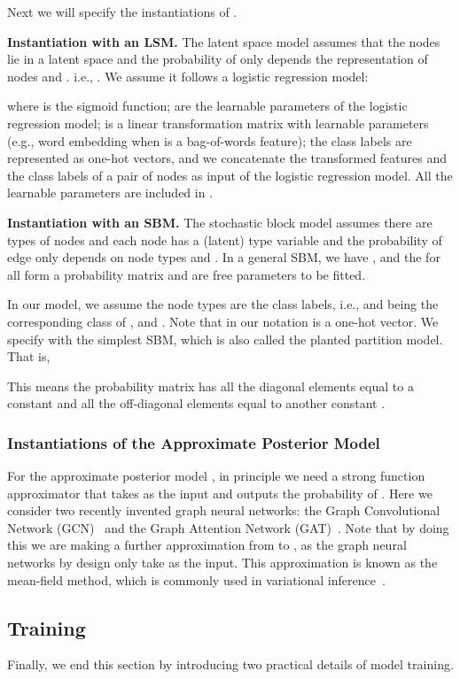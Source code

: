 \documentclass{article}
\newcommand{\vpara}[1]{\vspace{0.05in}\noindent\textbf{#1 }}
\begin{document}
Next we will specify the instantiations of .

\vpara{Instantiation with an LSM.} The latent space model assumes that the nodes lie in a latent space and the probability of  only depends the representation of nodes  and . i.e., . We assume it follows a logistic regression model:

where  is the sigmoid function;  are the learnable parameters of the logistic regression model;  is a linear transformation matrix with learnable parameters (e.g., word embedding when  is a bag-of-words feature); the class labels  are represented as one-hot vectors, and we concatenate the transformed features and the class labels of a pair of nodes as input of the logistic regression model. All the learnable parameters are included in .

\vpara{Instantiation with an SBM.} The stochastic block model assumes there are  types of nodes and each node  has a (latent) type variable  and the probability of edge  only depends on node types  and . In a general SBM, we have , and the  for all  form a probability matrix  and are free parameters to be fitted. 

In our model, we assume the node types are the class labels, i.e.,  and  being the corresponding class of , and . Note that in our notation  is a one-hot vector. We specify  with the simplest SBM, which is also called the planted partition model. That is,

This means the probability matrix  has all the diagonal elements equal to a constant  and all the off-diagonal elements equal to another constant .

\subsubsection{Instantiations of the Approximate Posterior Model}

For the approximate posterior model , in principle we need a strong function approximator that takes  as the input and outputs the probability of . Here we consider two recently invented graph neural networks: the Graph Convolutional Network (GCN)~\cite{kipf2016semi} and the Graph Attention Network (GAT)~\cite{velivckovic2017graph}. Note that by doing this we are making a further approximation from  to , as the graph neural networks by design only take  as the input. This approximation is known as the mean-field method, which is commonly used in variational inference~\cite{blei2017variational}. 

\subsection{Training}
Finally, we end this section by introducing two practical details of model training.
\end{document}
